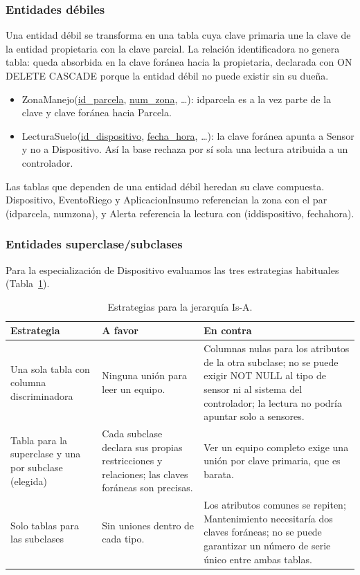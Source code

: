 \documentclass[11pt,letterpaper]{article}
\newcommand{\tbus}{\textunderscore\allowbreak}
\newcommand{\tb}[1]{{\ttfamily\let\_\tbus #1}}
\newcommand{\pk}[1]{\underline{#1}}
\begin{document}
\subsubsection{Entidades débiles}

Una entidad débil se transforma en una tabla cuya clave primaria une la clave de la entidad propietaria con la clave parcial. La relación identificadora no genera tabla: queda absorbida en la clave foránea hacia la propietaria, declarada con \tb{ON DELETE CASCADE} porque la entidad débil no puede existir sin su dueña.

\begin{itemize}[leftmargin=1.4em,itemsep=0.1em]
\item \tb{Zona\_Manejo}(\pk{id\_parcela}, \pk{num\_zona}, \ldots): \tb{id\_parcela} es a la vez parte de la clave y clave foránea hacia \tb{Parcela}.
\item \tb{Lectura\_Suelo}(\pk{id\_dispositivo}, \pk{fecha\_hora}, \ldots): la clave foránea apunta a \tb{Sensor} y no a \tb{Dispositivo}. Así la base rechaza por sí sola una lectura atribuida a un controlador.
\end{itemize}

Las tablas que dependen de una entidad débil heredan su clave compuesta. \tb{Dispositivo}, \tb{Evento\_Riego} y \tb{Aplicacion\_Insumo} referencian la zona con el par (\tb{id\_parcela}, \tb{num\_zona}), y \tb{Alerta} referencia la lectura con (\tb{id\_dispositivo}, \tb{fecha\_hora}).

\subsubsection{Entidades superclase/subclases}

Para la especialización de \tb{Dispositivo} evaluamos las tres estrategias habituales (Tabla~\ref{tab:isa}).

\begin{table}[H]
\centering\small
\begin{tabularx}{\textwidth}{>{\raggedright\arraybackslash}p{3.6cm}>{\raggedright\arraybackslash}X>{\raggedright\arraybackslash}X}
\toprule
\textbf{Estrategia} & \textbf{A favor} & \textbf{En contra} \\
\midrule
Una sola tabla con columna discriminadora & Ninguna unión para leer un equipo. & Columnas nulas para los atributos de la otra subclase; no se puede exigir \tb{NOT NULL} al tipo de sensor ni al sistema del controlador; la lectura no podría apuntar solo a sensores. \\
Tabla para la superclase y una por subclase (elegida) & Cada subclase declara sus propias restricciones y relaciones; las claves foráneas son precisas. & Ver un equipo completo exige una unión por clave primaria, que es barata. \\
Solo tablas para las subclases & Sin uniones dentro de cada tipo. & Los atributos comunes se repiten; \tb{Mantenimiento} necesitaría dos claves foráneas; no se puede garantizar un número de serie único entre ambas tablas. \\
\bottomrule
\end{tabularx}
\caption{Estrategias para la jerarquía Is-A.}
\label{tab:isa}
\end{table}
\end{document}
